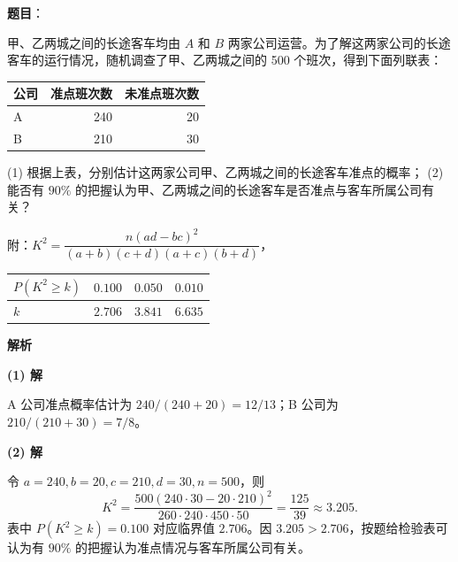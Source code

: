 \begin{answer}

\textbf{题目}：

甲、乙两城之间的长途客车均由 $A$ 和 $B$ 两家公司运营。为了解这两家公司的长途客车的运行情况，随机调查了甲、乙两城之间的 500 个班次，得到下面列联表：

\begin{center}
\begin{tabular}{lrr}
\toprule
公司 & 准点班次数 & 未准点班次数 \\
\midrule
A & 240 & 20 \\
B & 210 & 30 \\
\bottomrule
\end{tabular}
\end{center}

(1) 根据上表，分别估计这两家公司甲、乙两城之间的长途客车准点的概率；  
(2) 能否有 $90\%$ 的把握认为甲、乙两城之间的长途客车是否准点与客车所属公司有关？

附：$K^2=\dfrac{n(ad-bc)^2}{(a+b)(c+d)(a+c)(b+d)}$，

\begin{center}
\begin{tabular}{lrrr}
\toprule
$P(K^2\geq k)$ & $0.100$ & $0.050$ & $0.010$ \\
\midrule
$k$ & $2.706$ & $3.841$ & $6.635$ \\
\bottomrule
\end{tabular}
\end{center}

\textbf{解析}

\textbf{(1) 解}

A 公司准点概率估计为 $240/(240+20)=12/13$；B 公司为 $210/(210+30)=7/8$。

\textbf{(2) 解}

令 $a=240,b=20,c=210,d=30,n=500$，则
\nopagebreak[4]
\[K^2=\frac{500(240\cdot30-20\cdot210)^2}{260\cdot240\cdot450\cdot50}
=\frac{125}{39}\approx3.205.\]
表中 $P(K^2\geq k)=0.100$ 对应临界值 $2.706$。因 $3.205>2.706$，按题给检验表可认为有 $90\%$ 的把握认为准点情况与客车所属公司有关。



\end{answer}
